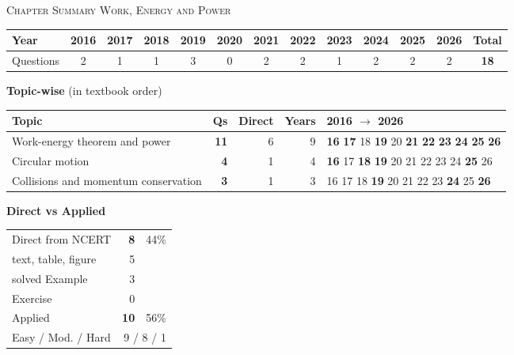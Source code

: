 \par{}\vspace{14pt}
\begin{center}{}\par
{\large\color{navy}\scshape Chapter Summary \textperiodcentered{} Work, Energy and Power}\end{center}
{\small\setlength{\tabcolsep}{3.5pt}
\begin{tabular*}{\linewidth}{@{\extracolsep{\fill}}l*{11}{c}c@{}}\toprule
Year & 2016 & 2017 & 2018 & 2019 & 2020 & 2021 & 2022 & 2023 & 2024 & 2025 & 2026 & Total\\\midrule
Questions & 2 & 1 & 1 & 3 & 0 & 2 & 2 & 1 & 2 & 2 & 2 & \textbf{18}\\\bottomrule\end{tabular*}}\par\medskip
{\small\textbf{\color{crimson}Topic-wise} (in textbook order)\par\smallskip
\begin{tabularx}{\linewidth}{@{}>{\raggedright\arraybackslash}Xrrrl@{}}\toprule
Topic & Qs & Direct & Years & 2016 $\rightarrow$ 2026\\\midrule
Work-energy theorem and power & \textbf{11} & 6 & 9 & {\scriptsize \textbf{16} \textbf{17} {\color{gray!45}18} \textbf{19} {\color{gray!45}20} \textbf{21} \textbf{22} \textbf{23} \textbf{24} \textbf{25} \textbf{26}}\\
Circular motion & \textbf{4} & 1 & 4 & {\scriptsize \textbf{16} {\color{gray!45}17} \textbf{18} \textbf{19} {\color{gray!45}20} {\color{gray!45}21} {\color{gray!45}22} {\color{gray!45}23} {\color{gray!45}24} \textbf{25} {\color{gray!45}26}}\\
Collisions and momentum conservation & \textbf{3} & 1 & 3 & {\scriptsize {\color{gray!45}16} {\color{gray!45}17} {\color{gray!45}18} \textbf{19} {\color{gray!45}20} {\color{gray!45}21} {\color{gray!45}22} {\color{gray!45}23} \textbf{24} {\color{gray!45}25} \textbf{26}}\\
\bottomrule\end{tabularx}}\par\medskip
\begin{minipage}[t]{0.34\linewidth}{\small\textbf{\color{crimson}Direct vs Applied}\par\smallskip
\begin{tabular}{@{}lrr@{}}\toprule
Direct from NCERT & \textbf{8} & 44\%\\
\quad text, table, figure & 5 &\\
\quad solved Example & 3 &\\
\quad Exercise & 0 &\\
Applied & \textbf{10} & 56\%\\\midrule
Easy / Mod. / Hard & \multicolumn{2}{r}{9 / 8 / 1}\\\bottomrule
\end{tabular}}\end{minipage}\hfill
